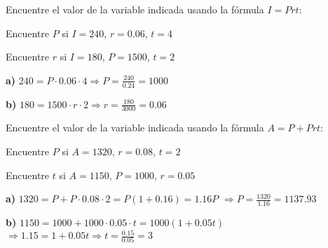 \begin{exercise}
\problem Encuentre el valor de la variable indicada usando la fórmula $I = Prt$:

\begin{exerciselist}
    \item Encuentre $P$ si $I = 240$, $r = 0.06$, $t = 4$
    \item Encuentre $r$ si $I = 180$, $P = 1500$, $t = 2$
\end{exerciselist}

\begin{solucion}
\textbf{a)} $240 = P \cdot 0.06 \cdot 4 \Rightarrow P = \frac{240}{0.24} = 1000$

\textbf{b)} $180 = 1500 \cdot r \cdot 2 \Rightarrow r = \frac{180}{3000} = 0.06$
\end{solucion}

\problem Encuentre el valor de la variable indicada usando la fórmula $A = P + Prt$:

\begin{exerciselist}
    \item Encuentre $P$ si $A = 1320$, $r = 0.08$, $t = 2$
    \item Encuentre $t$ si $A = 1150$, $P = 1000$, $r = 0.05$
\end{exerciselist}

\begin{solucion}
\textbf{a)} $1320 = P + P \cdot 0.08 \cdot 2 = P(1 + 0.16) = 1.16P$
$\Rightarrow P = \frac{1320}{1.16} = 1137.93$

\textbf{b)} $1150 = 1000 + 1000 \cdot 0.05 \cdot t = 1000(1 + 0.05t)$
$\Rightarrow 1.15 = 1 + 0.05t \Rightarrow t = \frac{0.15}{0.05} = 3$
\end{solucion}
\end{exercise}

